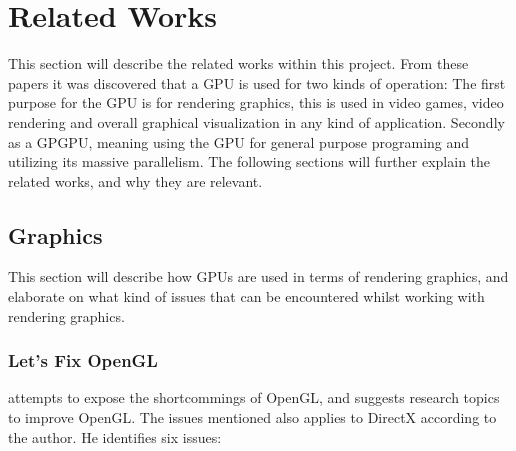\section{Related Works}\label{sec:related_works}
\begin{sectionmeta}
This section will describe the related works within this project.
From these papers it was discovered that a \gls{GPU} is used for two kinds of operation: 
The first purpose for the \gls{GPU} is for rendering graphics, this is used in video games, video rendering and overall graphical visualization in any kind of application. 
Secondly as a GP\gls{GPU}, meaning using the \gls{GPU} for general purpose programing and utilizing its massive parallelism.
The following sections will further explain the related works, and why they are relevant.
\end{sectionmeta}

\subsection{Graphics}
This section will describe how \glspl{GPU} are used in terms of rendering graphics, and elaborate on what kind of issues that can be encountered whilst working with rendering graphics.

\vspace{1em}

\subsubsection{Let's Fix OpenGL}

\citet{fix_opengl} attempts to expose the shortcommings of OpenGL, and suggests research topics to improve OpenGL. 
The issues mentioned also applies to DirectX according to the author. 
He identifies six issues: 

